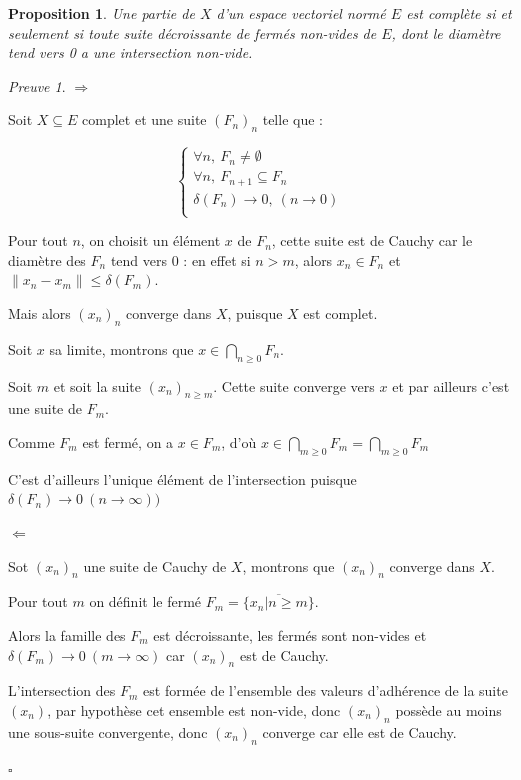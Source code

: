 \documentclass[]{article}
\newtheorem{myproposition}{Proposition}
\theoremstyle{remark}
\newtheorem{myproof}{Preuve}
\theoremstyle{definition}
\newcommand{\cqfd}{
	\hfill$\square$
}
\newenvironment{proofpart}[1]{
	\noindent
	{\textbf{\boldmath #1}}
}{
	\checkmark
}
\begin{document}
\begin{myproposition}
	Une partie de $X$ d'un espace vectoriel normé $E$ est complète si et seulement si toute suite décroissante de fermés non-vides de $E$, dont le diamètre tend vers 0 a une intersection non-vide.
\end{myproposition}

\begin{myproof}
	\begin{proofpart}{$\Longrightarrow$}
		Soit $X \subseteq E$ complet et une suite $(F_n)_n$ telle que :
		
		$$
		\left\{
			\begin{array}{l}
				\forall n, ~ F_n \neq \emptyset \\
				\forall n, ~ F_{n+1} \subseteq F_n \\
				\delta (F_n) \longrightarrow 0, ~ (n \rightarrow 0) \\
			\end{array}
		\right.
		$$
		
		Pour tout $n$, on choisit un élément $x$ de $F_n$, cette suite est de Cauchy car le diamètre des $F_n$ tend vers 0 : en effet si $n > m$, alors $x_n \in F_n$ et $\|x_n - x_m\| \leqslant \delta (F_m)$.
		
		Mais alors $(x_n)_n$ converge dans $X$, puisque $X$ est complet.
		
		Soit $x$ sa limite, montrons que $x \in \bigcap_{n \geqslant 0} F_n$.
		
		Soit $m$ et soit la suite $(x_n)_{n \geqslant m}$. Cette suite converge vers $x$ et par ailleurs c'est une suite de $F_m$.
		
		Comme $F_m$ est fermé, on a $x \in F_m$, d'où $x \in \bigcap_{m \geqslant 0} F_m = \bigcap_{m \geqslant 0} F_m$
		
		C'est d'ailleurs l'unique élément de l'intersection puisque $\delta(F_n) \longrightarrow 0 ~ (n \rightarrow \infty))$
	\end{proofpart}
	
	\begin{proofpart}{$\Longleftarrow$}
		Sot $(x_n)_n$ une suite de Cauchy de $X$, montrons que $(x_n)_n$ converge dans $X$.
		
		Pour tout $m$ on définit le fermé $F_m=\overline{\{x_n | n \geqslant m\}}$.
		
		Alors la famille des $F_m$ est décroissante, les fermés sont non-vides et $\delta(F_m) \longrightarrow 0 ~ (m \rightarrow \infty)$ car $(x_n)_n$ est de Cauchy.
		
		L'intersection des $F_m$ est formée de l'ensemble des valeurs d'adhérence de la suite $(x_n)$, par hypothèse cet ensemble est non-vide, donc $(x_n)_n$ possède au moins une sous-suite convergente, donc $(x_n)_n$ converge car elle est de Cauchy.
	\end{proofpart}
	
	\cqfd
\end{myproof}
\end{document}
